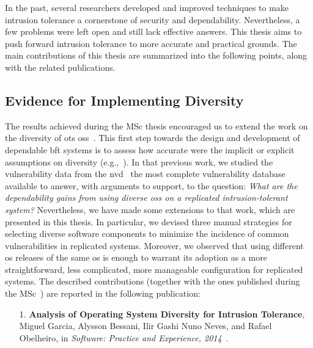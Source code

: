 In the past, several researchers developed and improved techniques to make intrusion tolerance a cornerstone of security and dependability.
Nevertheless, a few problems were left open and still lack effective answers.
This thesis aims to push forward intrusion tolerance to more accurate and practical grounds.
The main contributions of this thesis are summarized into the following points, along with the related publications.


\subsection{Evidence for Implementing Diversity}%


The results achieved during the MSc thesis encouraged us to extend the work on the diversity of \gls{ots} \glspl{os}~\cite{Garcia:2012}.
This first step towards the design and development of dependable \gls{bft} systems is to assess how accurate were the implicit or explicit assumptions on diversity (e.g.,~\cite{Abd-El-Malek:2005,Bessani:2008,Castro:2002,Castro:2003,Clement:2009,Correia:2004,Kapitza:2012,Kotla:2010,Moniz:2011,Yin:2003}).
In that previous work, we studied the vulnerability data from the \gls{nvd}~\cite{nvd} the most complete vulnerability database available to answer, with arguments to support, to the question:
\emph{What are the dependability gains from using diverse \glspl{os} on a replicated  intrusion-tolerant system?} 
Nevertheless, we have made some extensions to that work, which are presented in this thesis.
In particular, we devised three manual strategies for selecting diverse software components to minimize the incidence of common vulnerabilities in replicated systems.
Moreover, we observed that using different \gls{os} releases of the same \gls{os} is enough to warrant its adoption as a more straightforward, less complicated, more manageable configuration for replicated systems.
The described contributions (together with the ones published during the MSc~\cite{Garcia:2012}) are reported in the following publication:

\begin{enumerate}
\item[1.] \textbf{Analysis of Operating System Diversity for Intrusion Tolerance}, Miguel Garcia, Alysson Bessani, Ilir Gashi Nuno Neves, and Rafael Obelheiro, in \emph{Software: Practice and Experience, 2014}~\cite{Garcia:2014}.
\end{enumerate}




